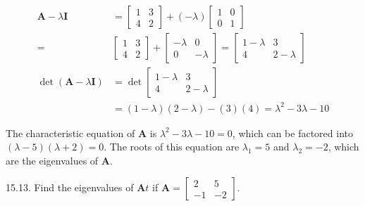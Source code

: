 \documentclass[10pt]{article}
\begin{document}
$$
\begin{aligned}
\mathbf{A}-\lambda \mathbf{I} & =\left[\begin{array}{ll}
1 & 3 \\
4 & 2
\end{array}\right]+(-\lambda)\left[\begin{array}{ll}
1 & 0 \\
0 & 1
\end{array}\right] \\
= & {\left[\begin{array}{ll}
1 & 3 \\
4 & 2
\end{array}\right]+\left[\begin{array}{cc}
-\lambda & 0 \\
0 & -\lambda
\end{array}\right]=\left[\begin{array}{cc}
1-\lambda & 3 \\
4 & 2-\lambda
\end{array}\right] } \\
\operatorname{det}(\mathbf{A}-\lambda \mathbf{I}) & =\operatorname{det}\left[\begin{array}{cc}
1-\lambda & 3 \\
4 & 2-\lambda
\end{array}\right] \\
& =(1-\lambda)(2-\lambda)-(3)(4)=\lambda^{2}-3 \lambda-10
\end{aligned}
$$

The characteristic equation of $\mathbf{A}$ is $\lambda^{2}-3 \lambda-10=0$, which can be factored into $(\lambda-5)(\lambda+2)=0$. The roots of this equation are $\lambda_{1}=5$ and $\lambda_{2}=-2$, which are the eigenvalues of $\mathbf{A}$.

15.13. Find the eigenvalues of $\mathbf{A} t$ if $\mathbf{A}=\left[\begin{array}{rr}2 & 5 \\ -1 & -2\end{array}\right]$.
\end{document}
